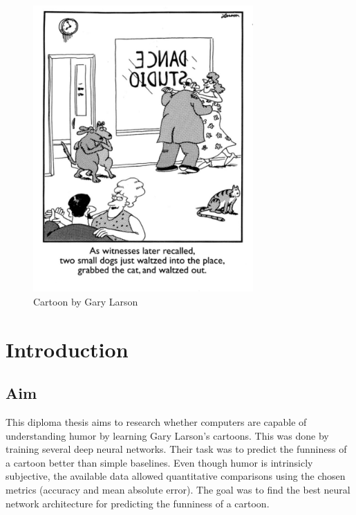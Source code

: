 \documentclass[draft,final,oneside]{vutinfth} %
\newenvironment{dedication}
  {%
   \thispagestyle{empty}%
   \vspace*{\stretch{1}}%
   \itshape             %
   \raggedleft          %
  }
  {\par %
   \vspace{\stretch{3}} %
   \clearpage           %
  }
\begin{document}

\tableofcontents* %

\mainmatter

\clearpage\thispagestyle{empty}\addtocounter{page}{-1}
\begin{dedication}
\begin{figure}[ht]
	\centering
  	\includegraphics[width=0.75\textwidth]{graphics/example_cartoon.png}
	\captionsetup{labelformat=empty}
	\caption[]{Cartoon by Gary Larson}
	\label{fig:fig1}
\end{figure}
\end{dedication}
\clearpage

\chapter{Introduction}

\section{Aim} \label{aim}
This diploma thesis aims to research whether computers are capable of understanding humor by learning Gary Larson's cartoons. This was done by training several deep neural networks. Their task was to predict the funniness of a cartoon better than simple baselines. Even though humor is intrinsicly subjective, the available data allowed quantitative comparisons using the chosen metrics (accuracy and mean absolute error). The goal was to find the best neural network architecture for predicting the funniness of a cartoon.
\end{document}
